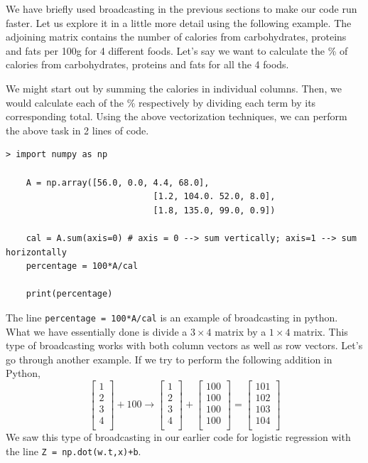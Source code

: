 \documentclass{article}[a4paper,12pt]
\theoremstyle{definition}
\begin{document}
We have briefly used broadcasting in the previous sections to make our code run faster. Let us explore it in a little more detail using the following example. The adjoining matrix contains the number of calories from carbohydrates, proteins and fats per 100g for 4 different foods. Let's say we want to calculate the \% of calories from carbohydrates, proteins and fats for all the 4 foods.  
\vspace{-6pt}

We might start out by summing the calories in individual columns. Then, we would calculate each of the \% respectively by dividing each term by its corresponding total. Using the above vectorization techniques, we can perform the above task in 2 lines of code.
\begin{Verbatim}[tabsize=2]
> import numpy as np
	
	A = np.array([56.0, 0.0, 4.4, 68.0],
							 [1.2, 104.0. 52.0, 8.0],
							 [1.8, 135.0, 99.0, 0.9])
	
	cal = A.sum(axis=0) # axis = 0 --> sum vertically; axis=1 --> sum horizontally
	percentage = 100*A/cal
	
	print(percentage)
\end{Verbatim}
The line \texttt{percentage = 100*A/cal} is an example of broadcasting in python. What we have essentially done is divide a $3\times 4$ matrix by a $1\times 4$ matrix. This type of broadcasting works with both column vectors as well as row vectors. Let's go through another example. If we try to perform the following addition in Python,
$$\begin{bmatrix}
	1 \\
	2 \\
	3 \\
	4 \\
\end{bmatrix} +100\longrightarrow
\begin{bmatrix}
	1 \\
	2 \\
	3 \\
	4 \\
\end{bmatrix}+
\begin{bmatrix}
	100 \\
	100 \\
	100 \\
	100 \\
\end{bmatrix}=
\begin{bmatrix}
	101 \\
	102 \\
	103 \\
	104 \\
\end{bmatrix}$$
We saw this type of broadcasting in our earlier code for logistic regression with the line \texttt{Z = np.dot(w.t,x)+b}.
\end{document}
